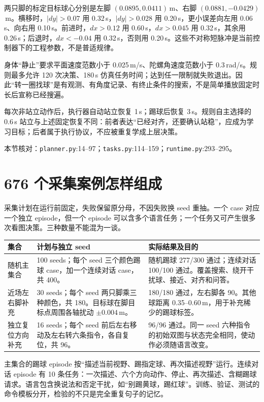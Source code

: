 两只脚的标定目标球心分别是左脚 $(0.0895,0.0411)$\,m、右脚 $(0.0881,-0.0429)$\,m。横移时，$|dy|>0.07$ 用 0.32\,s，$|dy|>0.028$ 用 0.20\,s，更小误差向左用 0.06\,s、向右用 0.10\,s。前进时，$dx>0.12$ 用 0.60\,s，$dx>0.045$ 用 0.32\,s，其余用 0.26\,s；后退时，$dx<-0.04$ 用 0.32\,s，否则用 0.20\,s。这些不对称短脉冲是当前控制器下的工程参数，不是普适规律。

身体“静止”要求平面速度范数小于 0.025\,m/s、陀螺角速度范数小于 0.3\,rad/s。规则最多允许 120 次决策、180\,s 仿真任务时间；达到任一限制就失败退出。因此“转一圈找球”是有观测、有角度记录、有终止条件的搜索，不是简单播放固定时长后宣称已经搜遍。

每次非站立动作后，执行器自动站立恢复 1\,s；踢球后恢复 3\,s。规则自主选择的 0.6\,s 站立与上述固定恢复不同：前者表达“已经对齐，还要确认站稳”，应成为学习目标；后者属于执行协议，不应被重复学成上层决策。

本节核对：\texttt{planner.py}:14--97；\texttt{tasks.py}:114--159；\texttt{runtime.py}:293--295。

\section{676 个采集案例怎样组成}

采集计划在运行前固定，失败保留原分母，不因失败换 seed 重抽。一个 case 对应一个独立 episode，但一个 episode 可以含多个语言任务；一个任务又可产生很多次看图决策。三种数量不能混为一谈。

\begin{longtable}{P{3.0cm}P{5.8cm}P{5.8cm}}
\hline
集合 & 计划与独立 seed & 实际结果及目的\\
\hline
\endhead
随机主集合 & 100 seeds；每个 seed 三个颜色踢球 case，加一个连续对话 case，共 400。 & 随机踢球 277/300 通过；连续对话 100/100 通过。覆盖搜索、绕开干扰球、接近、对齐和问答。\\
近场左右脚补充 & 30 seeds；每个 seed 两只脚乘三种颜色，共 180。目标球在脚目标点周围各轴扰动 $\pm0.004$\,m。 & 180/180 通过，左右脚各 90。其他球距离 0.35--0.60\,m，用于补充稀少的踢球标签。\\
独立复位方向补充 & 16 seeds；每个 seed 前后左右移动及左右转六条指令，各自复位，共 96。 & 96/96 通过。同一 seed 六种指令的初始双图与状态完全相同，使动作必须随语言改变。\\
\hline
\end{longtable}

主集合的踢球 episode 按“描述当前视野、踢指定球、再次描述视野”运行。连续对话 episode 有 10 条任务：一次描述、六个方向动作、停止、再次描述、含糊踢球请求。语言包含换说法和否定干扰，如“别踢黄球，踢红球”。训练、验证、测试的命令模板分开，检验的不只是完全重复句子的记忆。

